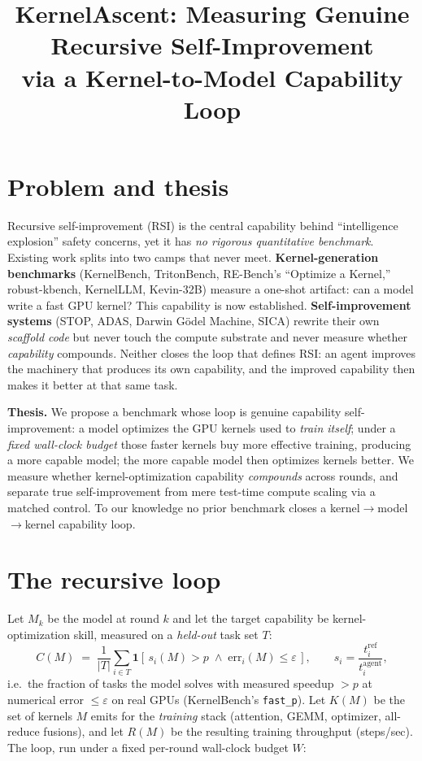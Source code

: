 \documentclass[10pt]{article}
\title{\vspace{-2.5em}\textbf{KernelAscent: Measuring Genuine Recursive Self-Improvement\\
via a Kernel-to-Model Capability Loop}}
\author{}
\date{}
\begin{document}
\maketitle
\vspace{-3.5em}

\section{Problem and thesis}
Recursive self-improvement (RSI) is the central capability behind ``intelligence
explosion'' safety concerns, yet it has \emph{no rigorous quantitative benchmark}.
Existing work splits into two camps that never meet. \textbf{Kernel-generation
benchmarks} (KernelBench, TritonBench, RE-Bench's ``Optimize a Kernel,''
robust-kbench, KernelLLM, Kevin-32B) measure a one-shot artifact: can a model write
a fast GPU kernel? This capability is now established. \textbf{Self-improvement
systems} (STOP, ADAS, Darwin G\"odel Machine, SICA) rewrite their own \emph{scaffold
code} but never touch the compute substrate and never measure whether \emph{capability}
compounds. Neither closes the loop that defines RSI: an agent improves the machinery
that produces its own capability, and the improved capability then makes it better at
that same task.

\textbf{Thesis.} We propose a benchmark whose loop is genuine capability
self-improvement: a model optimizes the GPU kernels used to \emph{train itself};
under a \emph{fixed wall-clock budget} those faster kernels buy more effective
training, producing a more capable model; the more capable model then optimizes
kernels better. We measure whether kernel-optimization capability \emph{compounds}
across rounds, and separate true self-improvement from mere test-time compute scaling
via a matched control. To our knowledge no prior benchmark closes a
kernel$\rightarrow$model$\rightarrow$kernel capability loop.

\section{The recursive loop}
Let $M_k$ be the model at round $k$ and let the target capability be
kernel-optimization skill, measured on a \emph{held-out} task set $T$:
\[
C(M) \;=\; \frac{1}{|T|}\sum_{i\in T}
\mathbf{1}\!\left[\, s_i(M) > p \;\wedge\; \mathrm{err}_i(M) \le \varepsilon \,\right],
\qquad s_i = \frac{t^{\text{ref}}_i}{t^{\text{agent}}_i},
\]
i.e.\ the fraction of tasks the model solves with measured speedup $>p$ at numerical
error $\le \varepsilon$ on real GPUs (KernelBench's \texttt{fast\_p}). Let $K(M)$ be
the set of kernels $M$ emits for the \emph{training} stack (attention, GEMM,
optimizer, all-reduce fusions), and let $R(M)$ be the resulting training throughput
(steps/sec). The loop, run under a fixed per-round wall-clock budget $W$:
\end{document}
